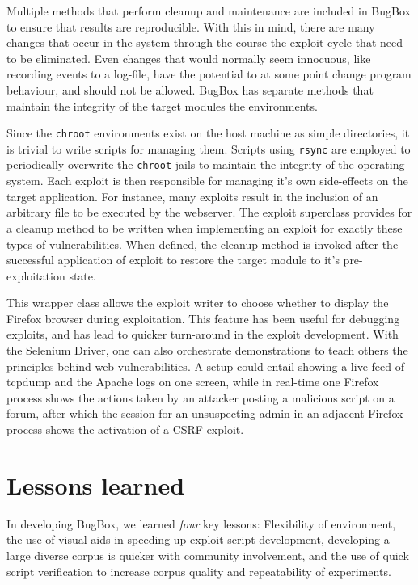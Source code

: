 \documentclass[letterpaper,twocolumn,10pt]{article}
\begin{document}
Multiple methods that perform cleanup and maintenance are included in BugBox to ensure that results are reproducible. With this in mind, there are many changes that occur in the system through the course the exploit cycle that need to be eliminated. Even changes that would normally seem innocuous, like recording events to a log-file, have the potential to at some point change program behaviour, and should not be allowed. BugBox has separate methods that maintain the integrity of the target modules the environments.

Since the {\tt chroot} environments exist on the host machine as simple directories, it is trivial to write scripts for managing them.  Scripts using {\tt rsync} are employed to periodically overwrite the {\tt chroot} jails to maintain the integrity of the operating system. Each exploit is then responsible for managing it's own side-effects on the target application. For instance, many exploits result in the inclusion of an arbitrary file to be executed by the webserver. The exploit superclass provides for a cleanup method to be written when implementing an exploit for exactly these types of vulnerabilities. When defined, the cleanup method is invoked after the successful application of exploit to restore the target module to it's pre-exploitation state. 


This wrapper class allows the exploit writer to choose whether to display the Firefox browser during exploitation. This feature has been useful for debugging exploits, and has lead to quicker turn-around in the exploit development. With the Selenium Driver, one can also orchestrate demonstrations to teach others the principles behind web vulnerabilities.  A setup could entail showing a live feed of tcpdump and the Apache logs on one screen, while in real-time one Firefox process shows the actions taken by an attacker posting a malicious script on a forum, after which the session for an unsuspecting admin in an adjacent Firefox process shows the activation of a CSRF exploit. 

\section {Lessons learned}

In developing BugBox, we learned {\em four} key lessons: Flexibility of environment, the use of visual aids in speeding up exploit script development, developing a large diverse corpus is quicker with community involvement, and the use of quick script verification to increase corpus quality and repeatability of experiments.\par
\end{document}
